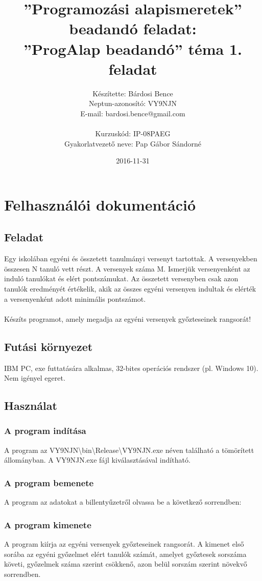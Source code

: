 \documentclass{article}
\title{”Programozási alapismeretek”\\ beadandó feladat:\\ ”ProgAlap beadandó” téma 1. feladat}
\date{2016-11-31}
\author{Készítette: Bárdosi Bence\\ Neptun-azonosító: VY9NJN\\ E-mail: bardosi.bence@gmail.com\\\\ Kurzuskód: IP-08PAEG\\ Gyakorlatvezető neve: Pap Gábor Sándorné}
\begin{document}
  \maketitle
  \newpage

  \tableofcontents
  \newpage

  \section{Felhasználói dokumentáció}
    \subsection{Feladat}
      Egy iskolában egyéni és összetett tanulmányi versenyt tartottak.
      A versenyekben összesen N tanuló vett részt. A versenyek száma M.
      Ismerjük versenyenként az induló tanulókat és elért pontszámukat.
      Az összetett versenyben csak azon tanulók eredményét értékelik,
      akik az összes egyéni versenyen indultak és elérték a versenyenként adott minimális pontszámot.
      \\
      \\ Készíts programot, amely megadja az egyéni versenyek győzteseinek rangsorát!
    \subsection{Futási környezet}
      IBM PC, exe futtatására alkalmas, 32-bites operációs rendszer (pl. Windows 10). Nem igényel egeret.
    \subsection{Használat}
      \subsubsection{A program indítása}
        A program az VY9NJN\textbackslash bin\textbackslash Release\textbackslash VY9NJN.exe néven található a tömörített állományban. A VY9NJN.exe fájl kiválasztásával indítható.
      \subsubsection{A program bemenete}
        A program az adatokat a billentyűzetről olvassa be a következő sorrendben:
      \subsubsection{A program kimenete}
        A program kiírja az egyéni versenyek győzteseinek rangsorát.
        A kimenet első sorába az egyéni győzelmet elért tanulók számát,
        amelyet győztesek sorszáma követi, győzelmek száma szerint csökkenő,
        azon belül sorszám szerint növekvő sorrendben.
\end{document}
